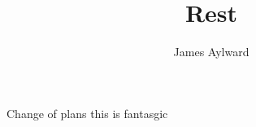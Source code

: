 \documentclass[12pt,english]{article}
\title{Rest}
\author{James Aylward}
\date{}
\begin{document}
    \maketitle\thispagestyle{fancy}
    Change of plans this is fantasgic
    
\end{document}
